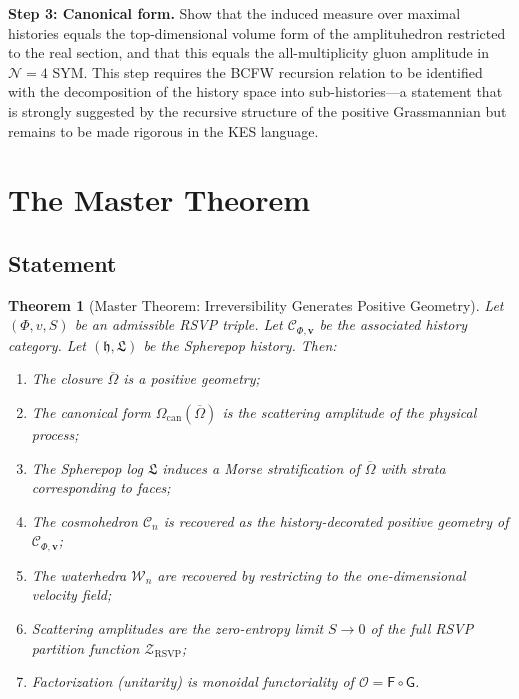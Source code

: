 \documentclass[12pt, oneside]{amsart}
\theoremstyle{plain}
\newtheorem{theorem}{Theorem}[section]
\theoremstyle{definition}
\theoremstyle{remark}
\newcommand{\Phif}{\Phi}   %
\newcommand{\vf}{v}         %
\newcommand{\Sf}{S}         %
\newcommand{\OmKS}{\Omega}
\newcommand{\hist}{\mathfrak{h}}
\newcommand{\Log}{\mathfrak{L}}
\newcommand{\Cosmo}{\mathcal{C}_n}
\newcommand{\Water}{\mathcal{W}_n}
\newcommand{\CF}{\Omega_{\mathrm{can}}}
\newcommand{\Ccat}{\mathcal{C}_{\Phi,\mathbf{v}}}
\newcommand{\Gfun}{\mathsf{G}}
\newcommand{\Ffun}{\mathsf{F}}
\newcommand{\Ofun}{\mathcal{O}}
\newcommand{\ZRSVP}{\mathcal{Z}_{\mathrm{RSVP}}}
\begin{document}
\textbf{Step 3: Canonical form.} Show that the induced measure over maximal histories equals the top-dimensional volume form of the amplituhedron restricted to the real section, and that this equals the all-multiplicity gluon amplitude in $\mathcal{N}=4$ SYM. This step requires the BCFW recursion relation to be identified with the decomposition of the history space into sub-histories---a statement that is strongly suggested by the recursive structure of the positive Grassmannian but remains to be made rigorous in the KES language.

\section{The Master Theorem}
\label{sec:master}

\subsection{Statement}

\begin{theorem}[Master Theorem: Irreversibility Generates Positive Geometry]
\label{thm:master}
Let $(\Phif, \vf, \Sf)$ be an admissible RSVP triple. Let $\Ccat$ be the associated history category. Let $(\hist, \Log)$ be the Spherepop history. Then:
\begin{enumerate}[label=(\roman*)]
  \item The closure $\overline{\OmKS}$ is a positive geometry;
  \item The canonical form $\CF(\overline{\OmKS})$ is the scattering amplitude of the physical process;
  \item The Spherepop log $\Log$ induces a Morse stratification of $\overline{\OmKS}$ with strata corresponding to faces;
  \item The cosmohedron $\Cosmo$ is recovered as the history-decorated positive geometry of $\Ccat$;
  \item The waterhedra $\Water$ are recovered by restricting to the one-dimensional velocity field;
  \item Scattering amplitudes are the zero-entropy limit $\Sf \to 0$ of the full RSVP partition function $\ZRSVP$;
  \item Factorization (unitarity) is monoidal functoriality of $\Ofun = \Ffun \circ \Gfun$.
\end{enumerate}
\end{theorem}
\end{document}
